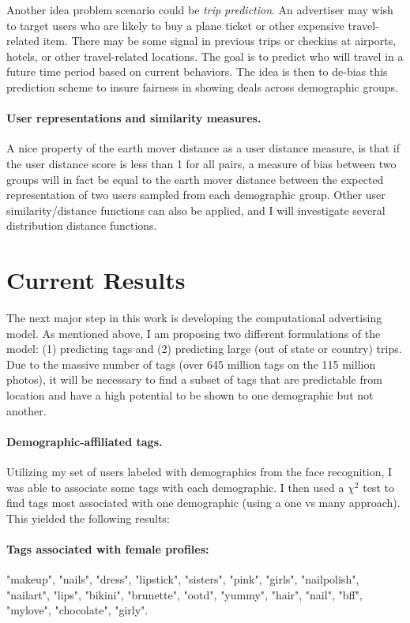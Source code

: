Another idea problem scenario could be \emph{trip prediction}.
An advertiser may wish to target users who are likely to buy a plane ticket or other expensive travel-related item.
There may be some signal in previous trips or checkins at airports, hotels, or other travel-related locations.
The goal is to predict who will travel in a future time period based on current behaviors.
The idea is then to de-bias this prediction scheme to insure fairness in showing deals across demographic groups.

\paragraph{User representations and similarity measures.}

A nice property of the earth mover distance as a user distance measure, is that if the user distance score is less than 1 for all pairs, a measure of bias between two groups will in fact be equal to the earth mover distance between the expected representation of two users sampled from each demographic group.
Other user similarity/distance functions can also be applied, and I will investigate several distribution distance functions.

\section{Current Results}

The next major step in this work is developing the computational advertising model.
As mentioned above, I am proposing two different formulations of the model: (1) predicting tags and (2) predicting large (out of state or country) trips.
Due to the massive number of tags (over 645 million tags on the 115 million photos), it will be necessary to find a subset of tags that are predictable from location and have a high potential to be shown to one demographic but not another.

\paragraph{Demographic-affiliated tags.}
Utilizing my set of users labeled with demographics from the face recognition, I was able to associate some tags with each demographic.
I then used a $\chi^2$ test to find tags most associated with one demographic (using a one vs many approach).
This yielded the following results:
\paragraph{Tags associated with female profiles:} "makeup", "nails", "dress", "lipstick", "sisters", "pink", "girls", "nailpolish", "nailart", "lips", "bikini", "brunette", "ootd", "yummy", "hair", "nail", "bff", "mylove", "chocolate", "girly".
